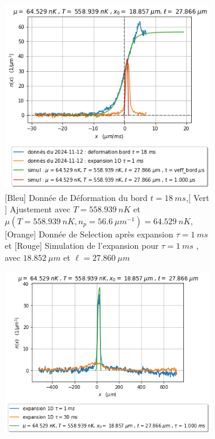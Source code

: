 \documentclass[a3, 10pt,twoside]{article}          %
\theoremstyle{plain}
\theoremstyle{definition}
\theoremstyle{remark}
\theoremstyle{definition} %
\begin{document}
		
		
		\begin{figure}[H]
			\begin{subfigure}[b]{0.45\textwidth}
        		\centering
        		\includegraphics[width=\textwidth]{Figures/simul_deformation_18_24-04-2024-1.1.png}
        		\caption{{\color{blue} [Bleu] Donnée de Déformation du bord $t= 18 ~ms$},{\color{OliveGreen}[ Vert ]  Ajustement avec $T = 558.939 ~nK$ et $\mu ( T =558.939 ~nK  , n_p = 56.6 ~{\mu m}^{-1} )= 64.529~nK$}, {\color{orange}[Orange] Donnée de Selection après expansion $\tau = 1~ms$} et {\color{red}[Rouge] Simulation de l'expansion pour $\tau= 1~ms$  , avec $18.852 ~\mu m $ et $\ell = 27.860 ~ \mu m $ }  }
        		\label{fig1.1:ajustementdeform}
    		\end{subfigure}
    		\hfill
    		\begin{subfigure}[b]{0.45\textwidth}
        		\centering
        		\includegraphics[width=\textwidth]{Figures/simul_expansion_1_24-04-2024-1.1.png}

\end{subfigure}
\end{figure}
\end{document}
